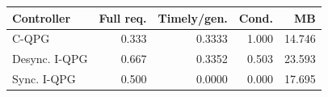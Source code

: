 \begin{tabular}{@{}lrrrr@{}}\toprule
Controller & Full req. & Timely/gen. & Cond. & MB \\
\midrule
C-QPG & 0.333 & 0.3333 & 1.000 & 14.746 \\
Desync. I-QPG & 0.667 & 0.3352 & 0.503 & 23.593 \\
Sync. I-QPG & 0.500 & 0.0000 & 0.000 & 17.695 \\
\bottomrule\end{tabular}
